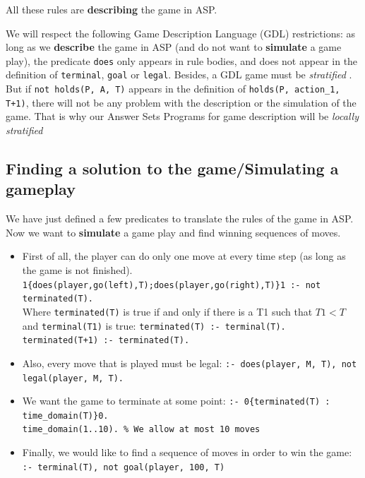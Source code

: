 All these rules are \textbf{describing} the game in ASP.

\bigskip

We will respect the following Game Description Language (GDL) restrictions: as long as we \textbf{describe} the game in ASP (and do not want to \textbf{simulate} a game play), the predicate \texttt{does} only appears in rule bodies, and does not appear in the definition of \texttt{terminal}, \texttt{goal} or \texttt{legal}. Besides, a GDL game must be \textit{stratified} \citep{stratified, gdl}. But if \texttt{not holds(P, A, T)} appears in the definition of \texttt{holds(P, action\_1, T+1)}, there will not be any problem with the description or the simulation of the game. That is why our Answer Sets Programs for game description will be \textit{locally stratified} \citep{locally_stratified}

\subsection{Finding a solution to the game/Simulating a gameplay}
\label{subsection:simulate}
We have just defined a few predicates to translate the rules of the game in ASP. Now we want to \textbf{simulate} a game play and find winning sequences of moves.
\begin{itemize}
\item First of all, the player can do only one move at every time step (as long as the game is not finished).\newline
\texttt{1\{does(player,go(left),T);does(player,go(right),T)\}1 :- not terminated(T).}\\
Where \texttt{terminated(T)} is true if and only if there is a T1 such that $T1<T$ and \texttt{terminal(T1)} is true:\newline
\texttt{terminated(T) :- terminal(T).}  \\
\texttt{terminated(T+1) :- terminated(T).}

\item Also, every move that is played must be legal:\newline
\texttt{:- does(player, M, T), not legal(player, M, T).}

\item We want the game to terminate at some point:\newline
\texttt{:- 0\{terminated(T) : time\_domain(T)\}0.}\\
\texttt{time\_domain(1..10). \% We allow at most 10 moves} 

\item Finally, we would like to find a sequence of moves in order to win the game:\newline
\texttt{:- terminal(T), not goal(player, 100, T)}

\end{itemize}

